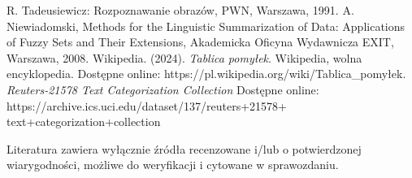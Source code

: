 \documentclass{article}
\begin{document}


\begin{thebibliography}{0}
 R. Tadeusiewicz: Rozpoznawanie obrazów, PWN, Warszawa, 1991.  
 A. Niewiadomski, Methods for the Linguistic Summarization of Data: Applications of Fuzzy Sets and Their Extensions, Akademicka Oficyna Wydawnicza EXIT, Warszawa, 2008.
 Wikipedia. (2024). \emph{Tablica pomyłek}. Wikipedia, wolna encyklopedia. Dostępne online: https://pl.wikipedia.org/wiki/Tablica\_pomyłek.
 \emph{Reuters-21578 Text Categorization Collection} Dostępne online: https://archive.ics.uci.edu/dataset/137/reuters+21578+\\text+categorization+collection
\end{thebibliography}

Literatura zawiera wyłącznie źródła recenzowane i/lub o potwierdzonej wiarygodności,
możliwe do weryfikacji i cytowane w sprawozdaniu. 
\end{document}
